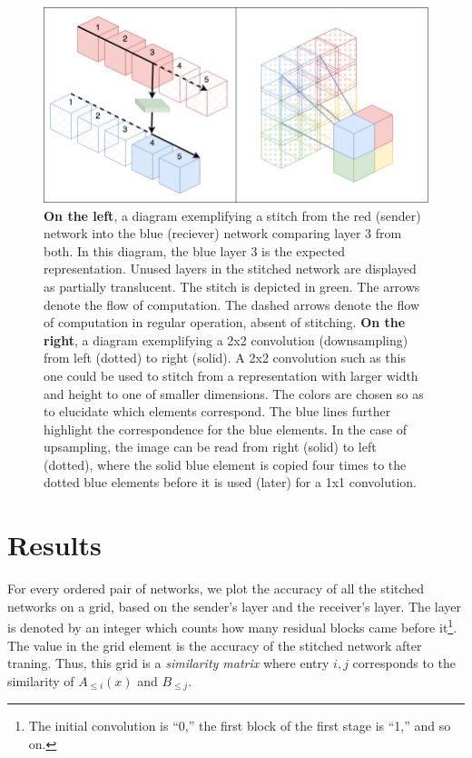\documentclass{article}
\begin{document}
\begin{center}
  \begin{figure}[H]
     \centering
     \includegraphics[width=12cm]{stitch2d2.drawio.png}
     \caption{\textbf{On the left}, a diagram exemplifying a stitch from the red (sender) network into the blue (reciever) 
     network comparing layer 3 from both. In this diagram, the blue layer 3 is the expected representation. Unused layers
     in the stitched network are displayed as partially translucent. The stitch
     is depicted in green. The arrows denote the flow of computation. The dashed arrows denote the flow of computation
     in regular operation, absent of stitching. \textbf{On the right}, a diagram exemplifying a 2x2 convolution (downsampling)
     from left (dotted) to right (solid). A 2x2 convolution such as this one could be used to stitch from a representation with 
     larger width and height to one of smaller dimensions. The colors are  chosen so as to elucidate which elements correspond.
     The blue lines further highlight the correspondence for the blue elements.
     In the case of upsampling, the image can be read from right (solid) to left (dotted), where the solid blue 
     element is copied four times to the
     dotted blue elements before it is used (later) for a 1x1 convolution.}
  \end{figure}
\end{center}

\section{Results}
\label{Results}
For every ordered pair of networks, we plot the accuracy of all the stitched networks on a grid,
based on the sender's layer and the receiver's layer. The layer is
denoted by an integer which counts how many residual blocks came before it\footnote{
   The initial convolution is ``0,'' the first block of the first stage is ``1,'' and so on.
}. The value in the grid element is the accuracy of the stitched network after traning. Thus, this
grid is a \textit{similarity matrix} where entry $i, j$ corresponds to the similarity of
$A_{\leq i}(x)$ and $B_{\leq j}$.
\end{document}
